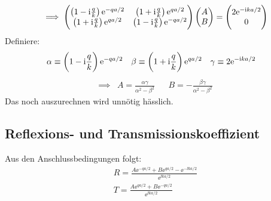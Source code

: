 \begin{align*}
 \implies
 \begin{pmatrix}
  \del{1 - \ii \frac qk}\ee^{-qa/2} & \del{1 + \ii\frac qk}\ee^{qa/2}\\
  \del{1 + \ii \frac qk}\ee^{qa/2} & \del{1 - \ii\frac qk}\ee^{-qa/2}
 \end{pmatrix}
 \begin{pmatrix}
  A\\
  B
 \end{pmatrix}
 =
 \begin{pmatrix}
  2\ee^{-\ii k a /2}\\
  0
 \end{pmatrix}
\end{align*}
Definiere:
\begin{align*}
 &\alpha \equiv \del{1 - \ii \frac qk}\ee^{-qa/2} &&\beta \equiv \del{1 + \ii\frac qk}\ee^{qa/2} &&\gamma \equiv   2\ee^{-\ii k a /2}
\end{align*}
\begin{align*}
 \implies &A = \frac{\alpha \gamma}{\alpha^2 - \beta^2} &&B = -\frac{\beta \gamma}{\alpha^2 - \beta^2}
\end{align*}
Das noch auszurechnen wird unnötig hässlich.



\subsection{Reflexions- und Transmissionskoeffizient}

Aus den Anschlussbedingungen folgt:
\begin{align*}
 R = \frac{A\ee^{-qa/2} + B\ee^{qa/2} - \ee^{-\ii ka/2}}{\ee^{\ii ka/2}}\\
 T = \frac{A\ee^{qa/2} + B\ee^{-qa/2}}{\ee^{\ii ka/2}}
\end{align*}



